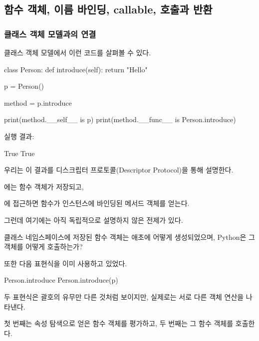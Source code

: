 

\subsection{함수 객체, 이름 바인딩, callable, 호출과 반환}

\subsubsection{클래스 객체 모델과의 연결}

클래스 객체 모델에서 이런 코드를 살펴볼 수 있다.

\begin{dhkcode}
class Person:
    def introduce(self):
        return "Hello"


p = Person()

method = p.introduce

print(method.__self__ is p)
print(method.__func__ is Person.introduce)
\end{dhkcode}

실행 결과:

\begin{dhkzsh}
True
True
\end{dhkzsh}

우리는 이 결과를 디스크립터 프로토콜(Descriptor Protocol)을 통해 설명한다.

에는 함수 객체가 저장되고,

에 접근하면 함수가 인스턴스에 바인딩된 메서드 객체를 얻는다.

그런데 여기에는 아직 독립적으로 설명하지 않은 전제가 있다.

클래스 네임스페이스에 저장된 함수 객체는 애초에 어떻게 생성되었으며, Python은 그 객체를 어떻게 호출하는가?

또한 다음 표현식을 이미 사용하고 있었다.

\begin{dhkcode}
Person.introduce
Person.introduce(p)
\end{dhkcode}

두 표현식은 괄호의 유무만 다른 것처럼 보이지만, 실제로는 서로 다른 객체 연산을 나타낸다.

첫 번째는 속성 탐색으로 얻은 함수 객체를 평가하고, 두 번째는 그 함수 객체를 호출한다.

